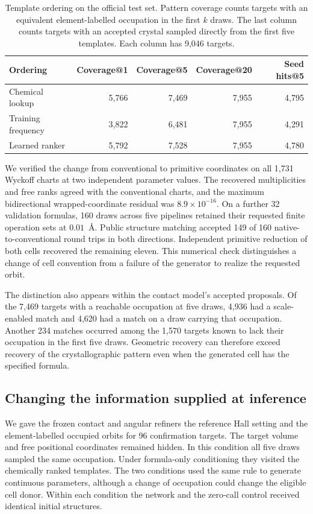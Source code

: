 \begin{table}[tbp]\centering\small
\caption{Template ordering on the official test set. Pattern coverage counts targets with an equivalent element-labelled occupation in the first $k$ draws. The last column counts targets with an accepted crystal sampled directly from the first five templates. Each column has 9,046 targets.}
\label{tab:gen-rank}
\begin{tabular}{lrrrr}\hline
Ordering & Coverage@1 & Coverage@5 & Coverage@20 & Seed hits@5\\\hline
Chemical lookup & 5,766 & 7,469 & 7,955 & 4,795\\
Training frequency & 3,822 & 6,481 & 7,955 & 4,291\\
Learned ranker & 5,792 & 7,528 & 7,955 & 4,780\\\hline
\end{tabular}
\end{table}

We verified the change from conventional to primitive coordinates on all 1,731 Wyckoff charts at two independent parameter values. The recovered multiplicities and free ranks agreed with the conventional charts, and the maximum bidirectional wrapped-coordinate residual was $8.9\times10^{-16}$. On a further 32 validation formulas, 160 draws across five pipelines retained their requested finite operation sets at $0.01$~\AA. Public structure matching accepted 149 of 160 native-to-conventional round trips in both directions. Independent primitive reduction of both cells recovered the remaining eleven. This numerical check distinguishes a change of cell convention from a failure of the generator to realize the requested orbit.

The distinction also appears within the contact model's accepted proposals. Of the 7,469 targets with a reachable occupation at five draws, 4,936 had a scale-enabled match and 4,620 had a match on a draw carrying that occupation. Another 234 matches occurred among the 1,570 targets known to lack their occupation in the first five draws. Geometric recovery can therefore exceed recovery of the crystallographic pattern even when the generated cell has the specified formula.

\subsection{Changing the information supplied at inference}

We gave the frozen contact and angular refiners the reference Hall setting and the element-labelled occupied orbits for 96 confirmation targets. The target volume and free positional coordinates remained hidden. In this condition all five draws sampled the same occupation. Under formula-only conditioning they visited the chemically ranked templates. The two conditions used the same rule to generate continuous parameters, although a change of occupation could change the eligible cell donor. Within each condition the network and the zero-call control received identical initial structures.

